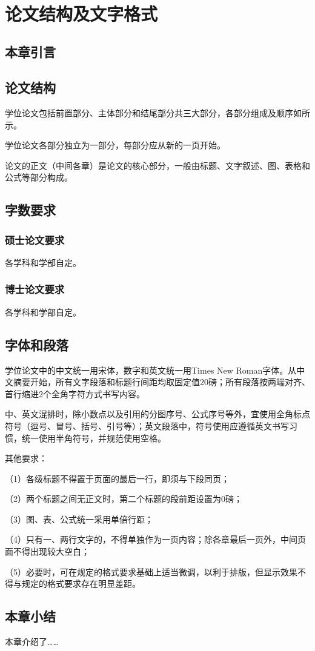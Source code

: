 \quad \\
\vspace{-20mm}

\section{论文结构及文字格式}



\subsection{本章引言}

\subsection{论文结构}

学位论文包括前置部分、主体部分和结尾部分共三大部分，各部分组成及顺序如所示。

学位论文各部分独立为一部分，每部分应从新的一页开始。

论文的正文（中间各章）是论文的核心部分，一般由标题、文字叙述、图、表格和公式等部分构成。


\subsection{字数要求}

\subsubsection{硕士论文要求}

各学科和学部自定。

\subsubsection{博士论文要求}

各学科和学部自定。

\subsection{字体和段落}
学位论文中的中文统一用宋体，数字和英文统一用Times New Roman字体。从中文摘要开始，所有文字段落和标题行间距均取固定值20磅；所有段落按两端对齐、首行缩进2个全角字符方式书写内容。

中、英文混排时，除小数点以及引用的分图序号、公式序号等外，宜使用全角标点符号（逗号、冒号、括号、引号等）；英文段落中，符号使用应遵循英文书写习惯，统一使用半角符号，并规范使用空格。

其他要求：

（1）各级标题不得置于页面的最后一行，即须与下段同页；

（2）两个标题之间无正文时，第二个标题的段前距设置为0磅；

（3）图、表、公式统一采用单倍行距；

（4）只有一、两行文字的，不得单独作为一页内容；除各章最后一页外，中间页面不得出现较大空白；

（5）必要时，可在规定的格式要求基础上适当微调，以利于排版，但显示效果不得与规定的格式要求存在明显差距。


\subsection{本章小结}
本章介绍了……




